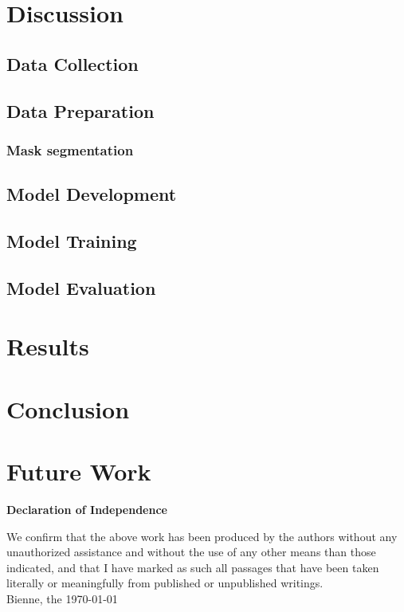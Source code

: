 \documentclass[12pt,a4paper]{scrartcl}
\begin{document}
\section{Discussion}\label{Discussion}

\subsection{Data Collection}
\subsection{Data Preparation}
\subsubsection{Mask segmentation}
\subsection{Model Development}
\subsection{Model Training}
\subsection{Model Evaluation}

\section{Results}\label{Results}


\newpage
\section{Conclusion}


\section{Future Work}

\markboth{}{}

\newpage





\newpage
\thispagestyle{empty}
\markboth{}{}
  \normalsize
\begin{center}
\huge{\textbf{ Declaration of Independence}}\\[40mm]
\end{center}
\large
We confirm that the above work has been produced by the authors without any unauthorized assistance and without the use of any other means than those indicated, and that I have marked as such all passages that have been taken literally or meaningfully from published or unpublished writings.\\[50mm]
Bienne, the \today

\newpage
\end{document}
